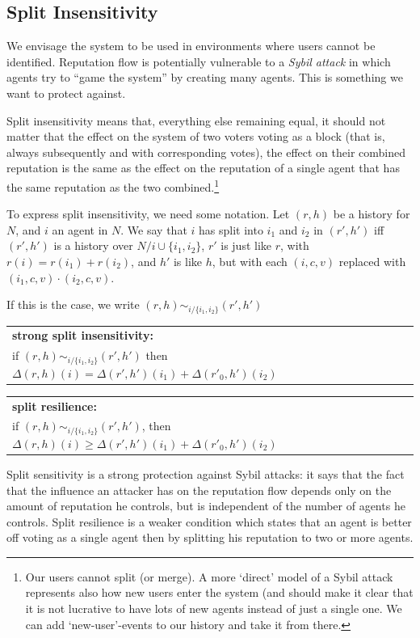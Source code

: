 \documentclass{article}
\newenvironment{condition}[1]
	{
	\begin{center}
	   \begin{tabular}{|p{.9\textwidth}|}
		\hline \medskip
		{\bf #1:}\\
	}
	{
		\medskip \\\hline
	\end{tabular}
	\end{center}
	}
\begin{document}
\subsection{Split Insensitivity}

We envisage the system to be used in environments where users cannot be identified.
Reputation flow is potentially vulnerable to a {\em Sybil attack} in which agents try to ``game the system'' by creating many agents. This is something we want to protect against. 

Split insensitivity means that, everything else remaining equal, it should not matter that the effect on the system of two voters voting as a block (that is, always subsequently and with corresponding votes), the effect on their combined reputation is the same as the effect on the reputation of a single agent that has the same reputation as the two combined.\footnote{Our users cannot split (or merge). A more `direct' model of a Sybil attack represents also how new users enter the system (and should make it clear that it is not lucrative to have lots of new agents instead of just a single one. We can add `new-user'-events to our history and take it from there.}

To express split insensitivity, we need some notation. Let $(r, h)$ be a history for $N$, and $i$ an agent in $N$. We say that $i$ has split into $i_1$ and $i_2$ in $(r', h')$  iff $(r', h')$ is a history over $N / {i} \cup \{i_1, i_2\}$, $r'$ is just like $r$, with $r(i) = r(i_1) + r(i_2)$, and $h'$ is like $h$, but with each $(i, c, v)$ replaced with $(i_1, c, v) \cdot (i_2, c, v)$. 

If this is the case, we write $(r, h) \sim_{i/\{i_1, i_2\}} (r', h')$

\begin{condition}{strong split insensitivity} 
if $(r, h) \sim_{i/\{i_1, i_2\}} (r', h')$ then $\Delta(r, h)(i) = \Delta(r', h')(i_1) + \Delta(r'_0, h')(i_2)$
\end{condition}


\begin{condition}{split resilience}
if $(r, h) \sim_{i/\{i_1, i_2\}} (r', h')$, then $\Delta(r, h)(i) \geq \Delta(r', h')(i_1) + \Delta(r'_0, h')(i_2)$
\end{condition}

%
Split sensitivity is a strong protection against Sybil attacks: it says that the fact that the influence an attacker has on the reputation flow depends only on the amount of reputation he controls, but is independent of the number of agents he controls. Split resilience is a weaker condition which states that an agent is better off voting as a single agent then by splitting his reputation to two or more agents. 
\end{document}
